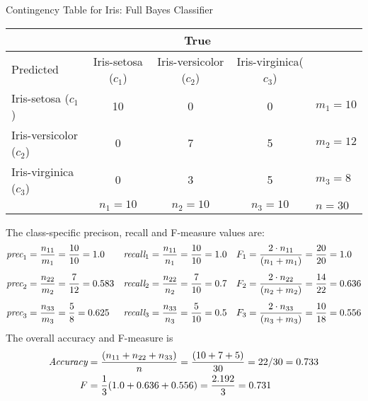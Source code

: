 \begin{frame}{Contingency Table for Iris: Full Bayes Classifier}
\renewcommand{\arraystretch}{1.1}
\begin{center}
\begin{footnotesize}
\begin{tabular}{|l||c|c|c||l|}
    \hline
    & \multicolumn{3}{c||}{True} & \\
    \hline
     Predicted & Iris-setosa ($c_1$) & Iris-versicolor ($c_2$)&
     Iris-virginica($c_3$) & \\
    \hline\hline
  Iris-setosa ($c_1$)&       10 & 0 & 0 & $m_1=10$\\
  Iris-versicolor ($c_2$)&   0  & 7 & 5 & $m_2 = 12$\\
  Iris-virginica  ($c_3$)&   0  & 3 & 5 & $m_3 = 8$\\
  \hline
  & $n_1 = 10$ & $n_2 = 10$ & $n_3 = 10$ & $n=30$\\
  \hline
  \end{tabular}%
\end{footnotesize}
\end{center}
\small
The class-specif\/{i}c precison, recall and F-measure values are:
  \begin{align*}
  \textit{prec}_1 &= {n_{11} \over m_1}  = \frac{10}{10} = 1.0 &
  \textit{recall}_1 &= {n_{11} \over n_1}  = \frac{10}{10} = 1.0 &
  F_1 &= {2\cdot n_{11} \over (n_1+m_1)}  = \frac{20}{20} = 1.0\\[4.5pt]
  \textit{prec}_2 &= {n_{22} \over m_2}  = \frac{7}{12} = 0.583 & 
  \textit{recall}_2 &= {n_{22} \over n_2}  = \frac{7}{10} = 0.7 &
  F_2 &= {2\cdot n_{22} \over (n_2+m_2)}  = \frac{14}{22} = 0.636\\[4.5pt]
  \textit{prec}_3 &= {n_{33} \over m_3}  = \frac{5}{8} = 0.625 &
  \textit{recall}_3 &= {n_{33} \over n_3}  = \frac{5}{10} = 0.5 &
  F_3 &= {2\cdot n_{33} \over (n_3+m_3)}  = \frac{10}{18} = 0.556
  \end{align*}
  The overall accuracy and F-measure is
  \begin{align*}
    \textit{Accuracy} & = {(n_{11} + n_{22} + n_{33}) \over n} = {(10+7+5) \over
    30} = {22/30} = 0.733\\
    F & = {1\over 3}(1.0 + 0.636 + 0.556)  = {2.192 \over 3} = 0.731
  \end{align*}

\end{frame}


